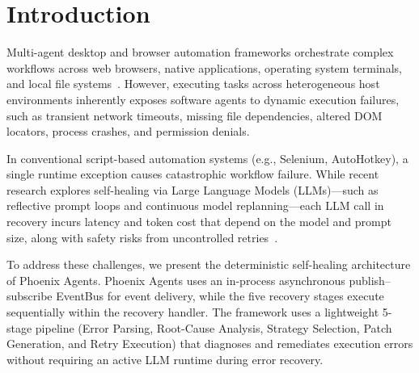 \documentclass[conference]{IEEEtran}
\newcommand{\chg}[1]{{\color{blue}#1}}
\begin{document}
\section{Introduction}
Multi-agent desktop and browser automation frameworks orchestrate complex workflows across web browsers, native applications, operating system terminals, and local file systems~\cite{bajoria2026}. However, executing tasks across heterogeneous host environments inherently exposes software agents to dynamic execution failures, such as transient network timeouts, missing file dependencies, altered DOM locators, process crashes, and permission denials.

In conventional script-based automation systems (e.g., Selenium, AutoHotkey), a single runtime exception causes catastrophic workflow failure. While recent research explores self-healing via Large Language Models (LLMs)---such as reflective prompt loops and continuous model replanning---each LLM call in recovery incurs latency and token cost that depend on the model and prompt size, along with safety risks from uncontrolled retries~\cite{babu2026,jeong2026}.

\chg{To address these challenges, we present the deterministic self-healing architecture of Phoenix Agents.} Phoenix Agents uses an in-process asynchronous publish--subscribe EventBus for event delivery, while the five recovery stages execute sequentially within the recovery handler. The framework uses a lightweight 5-stage pipeline (Error Parsing, Root-Cause Analysis, Strategy Selection, Patch Generation, and Retry Execution) that diagnoses and remediates execution errors without requiring an active LLM runtime during error recovery.
\end{document}
